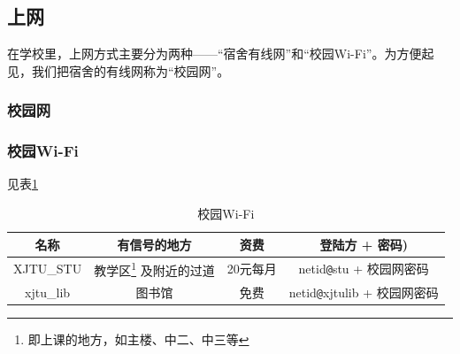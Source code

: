     \subsection{上网}
    在学校里，上网方式主要分为两种——“宿舍有线网”和“校园Wi-Fi”。为方便起见，我们把宿舍的有线网称为“校园网”。
    \subsubsection{校园网}
    \subsubsection{校园Wi-Fi}
    见表\ref{wifi}
        \begin{table}[h]           
            
            \begin{tabular}{c|c|c|c}
                \hline
                \hline
                名称 & 有信号的地方 & 资费 & 登陆方 + 密码)\\ \hline
                XJTU\_STU & 教学区\footnote{即上课的地方，如主楼、中二、中三等} 及附近的过道 & 20元每月 &netid\verb!@!stu + 校园网密码\\ \hline
                xjtu\_lib  & 图书馆  & 免费  & netid\verb!@!xjtulib + 校园网密码\\ \hline
            \end{tabular}
            
            \caption{校园Wi-Fi}
            \label{wifi}
        \end{table}